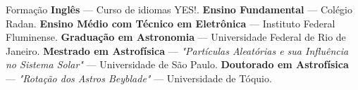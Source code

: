 \begin{rubric}{Formação}
\entry*[2018 -- 2023]%
	\textbf{Inglês} — Curso de idiomas YES!.
%
\entry*[2010 -- 2018]%
	\textbf{Ensino Fundamental} — Colégio Radan.
% 
\entry*[2019 -- 2022]%
	\textbf{Ensino Médio com Técnico em Eletrônica} — Instituto Federal Fluminense.
% 
\entry*[2023 -- 2026]%
	\textbf{Graduação em Astronomia} — Universidade Federal de Rio de Janeiro.
\entry*[2027 -- 2028]%
	\textbf{Mestrado em Astrofísica} — \textit{"Partículas Aleatórias e sua Influência no Sistema Solar"} — Universidade de São Paulo.
\entry*[2029 -- Presente]%
	\textbf{Doutorado em Astrofísica} — \textit{"Rotação dos Astros Beyblade"} — Universidade de Tóquio.
\end{rubric}
